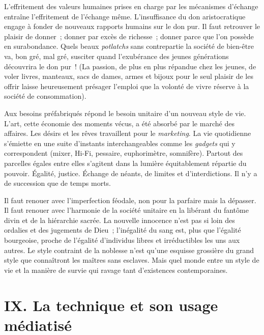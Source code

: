 \documentclass[french,twoside]{book} %
\begin{document}
\noindent L’effritement des valeurs humaines prises en charge par les mécanismes d’échange entraîne l’effritement de l’échange même. L’insuffisance du don aristocratique engage à fonder de nouveaux rapports humains sur le don pur. Il faut retrouver le plaisir de donner ; donner par excès de richesse ; donner parce que l’on possède en surabondance. Quels beaux \emph{potlatchs} sans contrepartie la société de bien-être va, bon gré, mal gré, susciter quand l’exubérance des jeunes générations découvrira le don pur ! (La passion, de plus en plus répandue chez les jeunes, de voler livres, manteaux, sacs de dames, armes et bijoux pour le seul plaisir de les offrir laisse heureusement présager l’emploi que la volonté de vivre réserve à la société de consommation).\par
Aux besoins préfabriqués répond le besoin unitaire d’un nouveau style de vie. L’art, cette économie des moments vécus, a été absorbé par le marché des affaires. Les désirs et les rêves travaillent pour le \emph{marketing}. La vie quotidienne s’émiette en une suite d’instants interchangeables comme les \emph{gadgets} qui y correspondent (mixer, Hi-Fi, pessaire, euphorimètre, somnifère). Partout des parcelles égales entre elles s’agitent dans la lumière équitablement répartie du pouvoir. Égalité, justice. Échange de néants, de limites et d’interdictions. Il n’y a de succession que de temps morts.\par
Il faut renouer avec l’imperfection féodale, non pour la parfaire mais la dépasser. Il faut renouer avec l’harmonie de la société unitaire en la libérant du fantôme divin et de la hiérarchie sacrée. La nouvelle innocence n’est pas si loin des ordalies et des jugements de Dieu ; l’inégalité du sang est, plus que l’égalité bourgeoise, proche de l’égalité d’individus libres et irréductibles les uns aux autres. Le style contraint de la noblesse n’est qu’une esquisse grossière du grand style que connaîtront les maîtres sans esclaves. Mais quel monde entre un style de vie et la manière de survie qui ravage tant d’existences contemporaines.
\section[{IX. La technique et son usage médiatisé}]{IX. La technique et son usage médiatisé}\renewcommand{\leftmark}{IX. La technique et son usage médiatisé}
\end{document}
